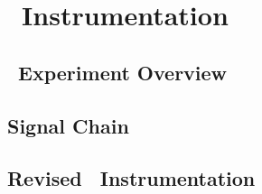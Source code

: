 \chapter{\prizm~Instrumentation}
    \section{\prizm~Experiment Overview}
    \section{Signal Chain}
        \subsection{}
        \subsection{}
        \subsection{}
    \section{Revised \prizm~Instrumentation}
        \subsection{}
          
        \subsection{}
	